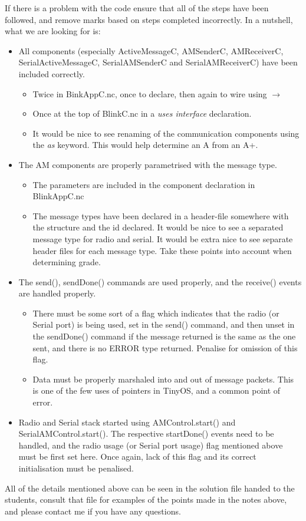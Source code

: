 \documentclass [a4] {article}
\begin{document}
If there is a problem with the code ensure that all of the steps have been followed, and remove marks based on steps completed incorrectly. In a nutshell, what we are looking for is:
\linebreak
\\
\begin{itemize}

\item All components (especially ActiveMessageC, AMSenderC, AMReceiverC, SerialActiveMessageC, SerialAMSenderC and SerialAMReceiverC) have been included correctly.
    \begin{itemize}
    \item Twice in BinkAppC.nc, once to declare, then again to wire using $\rightarrow$
    \item Once at the top of BlinkC.nc in a \textit{uses interface} declaration.
    \item It would be nice to see renaming of the communication components using the \textit{as} keyword. This would help determine an A from an A+.
    \end{itemize}
 
\item The AM components are properly parametrised with the message type.
    \begin{itemize}
    \item The parameters are included in the component declaration in BlinkAppC.nc
    \item The message types have been declared in a header-file somewhere with the structure and the id declared. It would be nice to see a separated message type for radio and serial. It would be extra nice to see separate header files for each message type. Take these points into account when determining grade. 
    \end{itemize}

\item The send(), sendDone() commands are used properly, and the receive() events are handled properly.
    \begin{itemize}
    \item There must be some sort of a flag which indicates that the radio (or Serial port) is being used, set in the send() command, and then unset in the sendDone() command if the message returned is the same as the one sent, and there is no ERROR type returned. Penalise for omission of this flag.
    \item Data must be properly marshaled into and out of message packets. This is one of the few uses of pointers in TinyOS, and a common point of error.
    \end{itemize}

\item Radio and Serial stack started using AMControl.start() and SerialAMControl.start(). The respective startDone() events need to be handled, and the radio usage (or Serial port usage) flag mentioned above must be first set here. Once again, lack of this flag and its correct initialisation must be penalised.

\end{itemize}

All of the details mentioned above can be seen in the solution file handed to the students, consult that file for examples of the points made in the notes above, and please contact me if you have any questions.
\end{document}

